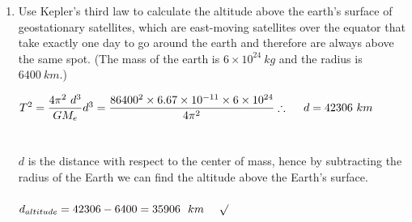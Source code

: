 \documentclass[fleqn]{article}
\begin{document}
\begin{enumerate}
\begin{enumerate}
      \item Use Kepler’s third law to calculate the altitude above the earth’s
      surface of geostationary satellites, which are east-moving satellites
      over the equator that take exactly one day to go around the earth
      and therefore are always above the same spot. (The mass of the
      earth is $6 \times 10^{24} ~ kg$ and the radius is $6400 ~ km$.)

        \textcolor{hwColor}{
          $
            T^2=\dfrac{4 \pi^2 ~ d^3}{G M_e} \\
            \\
            \\
            d^3=\dfrac{86400^2 \times 6.67 \times 10^{-11} \times 6 \times 10^{24}}{4 \pi^2} \\
            \\
            \\
            \therefore ~~~~ d=42306 ~ km  
          $
          \\
          \\
          \\
          $d$ is the distance with respect to the center of mass, hence by subtracting the radius of the Earth we can find the altitude above the Earth’s
          surface. \\
          \\
          $
            d_{altitude}=42306-6400=35906 ~~ km ~~~~ \surd
          $ 
        }


    \end{enumerate}

  \end{enumerate}
\end{document}
